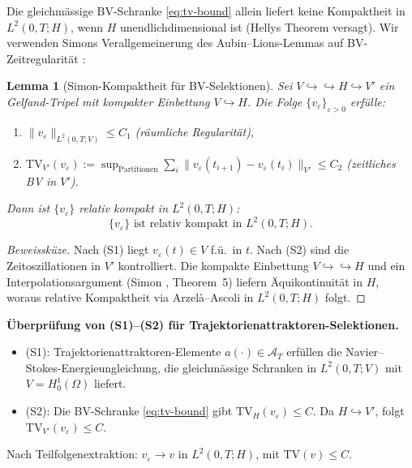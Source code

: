 \documentclass[12pt,a4paper]{article}
\theoremstyle{definition}
\theoremstyle{plain}
\newtheorem{lemma}[definition]{Lemma}
\theoremstyle{remark}
\begin{document}
Die gleichm\"assige BV-Schranke \eqref{eq:tv-bound} allein liefert keine Kompaktheit in $L^2(0,T;H)$, wenn $H$ unendlichdimensional ist (Hellys Theorem versagt). Wir verwenden Simons Verallgemeinerung des Aubin--Lions-Lemmas auf BV-Zeitregularit\"at \cite{Simon1987}:

\begin{lemma}[Simon-Kompaktheit f\"ur BV-Selektionen]\label{lem:simon-bv}
Sei $V \hookrightarrow\!\!\!\hookrightarrow H \hookrightarrow V'$ ein Gelfand-Tripel mit kompakter Einbettung $V \hookrightarrow H$. Die Folge $\{v_\varepsilon\}_{\varepsilon > 0}$ erf\"ulle:
\begin{enumerate}
\item[\textup{(S1)}] $\|v_\varepsilon\|_{L^2(0,T;V)} \leq C_1$ \quad (r\"aumliche Regularit\"at),
\item[\textup{(S2)}] $\mathrm{TV}_{V'}(v_\varepsilon) := \sup_{\text{Partitionen}} \sum_i \|v_\varepsilon(t_{i+1}) - v_\varepsilon(t_i)\|_{V'} \leq C_2$ \quad (zeitliches BV in $V'$).
\end{enumerate}
Dann ist $\{v_\varepsilon\}$ relativ kompakt in $L^2(0,T;H)$:
\begin{equation}\label{eq:aubin-lions}
  \{v_\varepsilon\} \text{ ist relativ kompakt in } L^2(0,T;H).
\end{equation}
\end{lemma}

\begin{proof}[Beweissk\"uze]
Nach (S1) liegt $v_\varepsilon(t) \in V$ f.\"u.~in $t$. Nach (S2) sind die Zeitoszillationen in $V'$ kontrolliert. Die kompakte Einbettung $V \hookrightarrow\!\!\!\hookrightarrow H$ und ein Interpolationsargument (Simon \cite{Simon1987}, Theorem~5) liefern \"Aquikontinuit\"at in $H$, woraus relative Kompaktheit via Arzel\`a--Ascoli in $L^2(0,T;H)$ folgt.
\end{proof}

\noindent\textbf{\"Uberpr\"ufung von (S1)--(S2) f\"ur Trajektorienattraktoren-Selektionen.}
\begin{itemize}
\item (S1): Trajektorienattraktoren-Elemente $a(\cdot) \in \mathcal{A}_T$ erf\"ullen die Navier--Stokes-Energieungleichung, die gleichm\"assige Schranken in $L^2(0,T;V)$ mit $V = H^1_0(\Omega)$ liefert.
\item (S2): Die BV-Schranke \eqref{eq:tv-bound} gibt $\mathrm{TV}_H(v_\varepsilon) \leq C$. Da $H \hookrightarrow V'$, folgt $\mathrm{TV}_{V'}(v_\varepsilon) \leq C$.
\end{itemize}
Nach Teilfolgenextraktion: $v_\varepsilon \to v$ in $L^2(0,T;H)$, mit $\mathrm{TV}(v) \leq C$.
\end{document}

